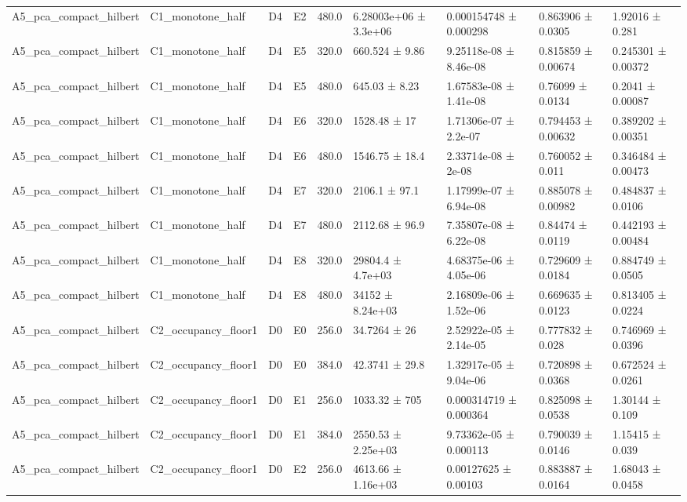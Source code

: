 \begin{table}
\begin{tabular}{lllllllll}
A5\_pca\_compact\_hilbert & C1\_monotone\_half & D4 & E2 & 480.0 & 6.28003e+06 ± 3.3e+06 & 0.000154748 ± 0.000298 & 0.863906 ± 0.0305 & 1.92016 ± 0.281 \\
A5\_pca\_compact\_hilbert & C1\_monotone\_half & D4 & E5 & 320.0 & 660.524 ± 9.86 & 9.25118e-08 ± 8.46e-08 & 0.815859 ± 0.00674 & 0.245301 ± 0.00372 \\
A5\_pca\_compact\_hilbert & C1\_monotone\_half & D4 & E5 & 480.0 & 645.03 ± 8.23 & 1.67583e-08 ± 1.41e-08 & 0.76099 ± 0.0134 & 0.2041 ± 0.00087 \\
A5\_pca\_compact\_hilbert & C1\_monotone\_half & D4 & E6 & 320.0 & 1528.48 ± 17 & 1.71306e-07 ± 2.2e-07 & 0.794453 ± 0.00632 & 0.389202 ± 0.00351 \\
A5\_pca\_compact\_hilbert & C1\_monotone\_half & D4 & E6 & 480.0 & 1546.75 ± 18.4 & 2.33714e-08 ± 2e-08 & 0.760052 ± 0.011 & 0.346484 ± 0.00473 \\
A5\_pca\_compact\_hilbert & C1\_monotone\_half & D4 & E7 & 320.0 & 2106.1 ± 97.1 & 1.17999e-07 ± 6.94e-08 & 0.885078 ± 0.00982 & 0.484837 ± 0.0106 \\
A5\_pca\_compact\_hilbert & C1\_monotone\_half & D4 & E7 & 480.0 & 2112.68 ± 96.9 & 7.35807e-08 ± 6.22e-08 & 0.84474 ± 0.0119 & 0.442193 ± 0.00484 \\
A5\_pca\_compact\_hilbert & C1\_monotone\_half & D4 & E8 & 320.0 & 29804.4 ± 4.7e+03 & 4.68375e-06 ± 4.05e-06 & 0.729609 ± 0.0184 & 0.884749 ± 0.0505 \\
A5\_pca\_compact\_hilbert & C1\_monotone\_half & D4 & E8 & 480.0 & 34152 ± 8.24e+03 & 2.16809e-06 ± 1.52e-06 & 0.669635 ± 0.0123 & 0.813405 ± 0.0224 \\
A5\_pca\_compact\_hilbert & C2\_occupancy\_floor1 & D0 & E0 & 256.0 & 34.7264 ± 26 & 2.52922e-05 ± 2.14e-05 & 0.777832 ± 0.028 & 0.746969 ± 0.0396 \\
A5\_pca\_compact\_hilbert & C2\_occupancy\_floor1 & D0 & E0 & 384.0 & 42.3741 ± 29.8 & 1.32917e-05 ± 9.04e-06 & 0.720898 ± 0.0368 & 0.672524 ± 0.0261 \\
A5\_pca\_compact\_hilbert & C2\_occupancy\_floor1 & D0 & E1 & 256.0 & 1033.32 ± 705 & 0.000314719 ± 0.000364 & 0.825098 ± 0.0538 & 1.30144 ± 0.109 \\
A5\_pca\_compact\_hilbert & C2\_occupancy\_floor1 & D0 & E1 & 384.0 & 2550.53 ± 2.25e+03 & 9.73362e-05 ± 0.000113 & 0.790039 ± 0.0146 & 1.15415 ± 0.039 \\
A5\_pca\_compact\_hilbert & C2\_occupancy\_floor1 & D0 & E2 & 256.0 & 4613.66 ± 1.16e+03 & 0.00127625 ± 0.00103 & 0.883887 ± 0.0164 & 1.68043 ± 0.0458 \\

\end{tabular}
\end{table}
